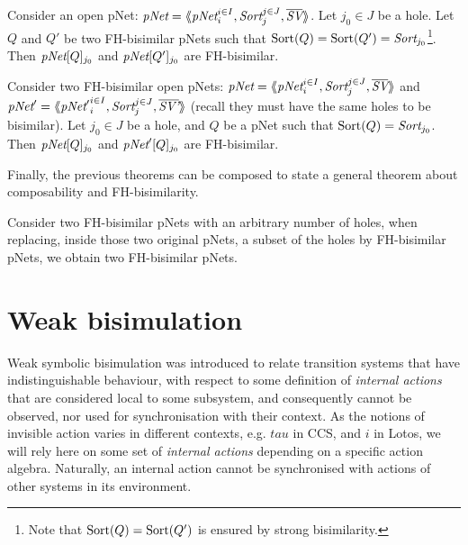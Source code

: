 \documentclass{lncs/llncs}
\begin{document}
\begin{theorem}[Congruence]\label{thm-congr-eq}
	Consider an open pNet:
	$\pNet = \mylangle \pNet_i^{i\in I}, \Sort_j^{j\in J}, 
	\overline{\symb{SV}}\myrangle$.
	Let $j_0\in J$ be a hole. Let $Q$ and $Q'$ be two FH-bisimilar pNets such that 
	$\Sortop(Q)=\Sortop(Q')=\Sort_{j_0}$\footnote{Note that $\operatorname{Sort}(Q)=\operatorname{Sort}(Q')$ is 
	ensured by 
	strong bisimilarity.}. Then 
	$\pNet[Q]_{j_0}$ and 
	$\pNet[Q']_{j_0}$ are FH-bisimilar.
\end{theorem}

\begin{theorem}\label{thm-ctxt-eq}
	Consider two FH-bisimilar open pNets:
	$\pNet = \mylangle \pNet_i^{i\in I}, \Sort_j^{j\in J}, 
	\overline{\symb{SV}}\myrangle$ and 	$\pNet' = \mylangle {\pNet'}_i^{i\in I}, 
	\Sort_j^{j\in 
	J}, 	\overline{\symb{SV'}}\myrangle$ 
	(recall they must have the same holes to be bisimilar).
	Let $j_0\in J$ be a hole, and $Q$ be a pNet such that $\Sortop(Q)=\Sort_{j_0}$. Then 
	$\pNet[Q]_{j_0}$ and 
	$\pNet'[Q]_{j_0}$ are FH-bisimilar.
\end{theorem}

Finally, the previous theorems can be composed to state a general theorem about 
composability and FH-bisimilarity.
\begin{theorem}[Composability]
	Consider two FH-bisimilar pNets with an arbitrary number of holes, when replacing, 
	inside those two original pNets, a subset of the holes by FH-bisimilar pNets, we 
	obtain two FH-bisimilar pNets.
\end{theorem}
%


\section{Weak bisimulation}

Weak symbolic bisimulation was introduced to relate transition systems
that have indistinguishable behaviour, with respect to some definition
of \emph{internal actions} that are considered local to some
subsystem, and consequently cannot be observed, nor used for
synchronisation with their context.
As the notions of invisible action varies in different contexts,
e.g. $tau$ in CCS, and $i$ in Lotos, we will rely here on some set of
\emph{internal actions} depending on a specific action
algebra. Naturally, an internal action cannot be synchronised with
actions of other systems in its environment. 
\end{document}
